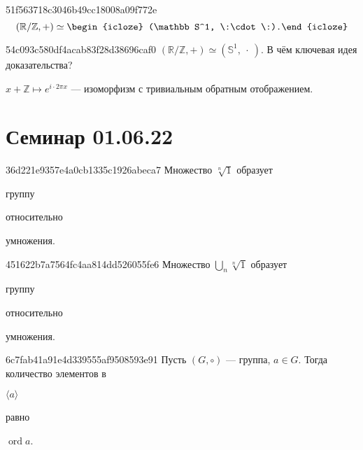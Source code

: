 \begin{note}{51f563718c3046b49cc18008a09f772e}
    \[
        (\mathbb R / \mathbb Z, +) \simeq \begin{icloze}{1}(\mathbb S^1, \:\cdot\:).\end{icloze}
    \]
\end{note}

\begin{note}{54c093c580df4acab83f28d38696caf0}
    \({ (\mathbb R / \mathbb Z, +) \simeq (\mathbb S^1, \:\cdot\:) }\).
    В чём ключевая идея доказательства?

    \begin{cloze}{1}
        \({ x + \mathbb Z \mapsto e^{i \cdot 2\pi x} }\) --- изоморфизм с тривиальным обратным отображением.
    \end{cloze}
\end{note}

\section{Семинар 01.06.22}
\begin{note}{36d221e9357e4a0cb1335c1926abeca7}
    Множество \({ \sqrt[n]{1} }\) образует \begin{icloze}{2}группу\end{icloze} относительно \begin{icloze}{1}умножения.\end{icloze}
\end{note}

\begin{note}{451622b7a7564fc4aa814dd526055fe6}
    Множество \({ \displaystyle \bigcup_{n}^{} \sqrt[n]{1} }\) образует \begin{icloze}{2}группу\end{icloze} относительно \begin{icloze}{1}умножения.\end{icloze}
\end{note}

\begin{note}{6c7fab41a91e4d339555af9508593e91}
    Пусть \({ (G, \circ) }\) --- группа,\: \({ a \in G }\).
    Тогда количество элементов в \begin{icloze}{2}\({ \langle a \rangle }\)\end{icloze} равно \begin{icloze}{1}\({ \operatorname{ord} a }\).\end{icloze}
\end{note}


